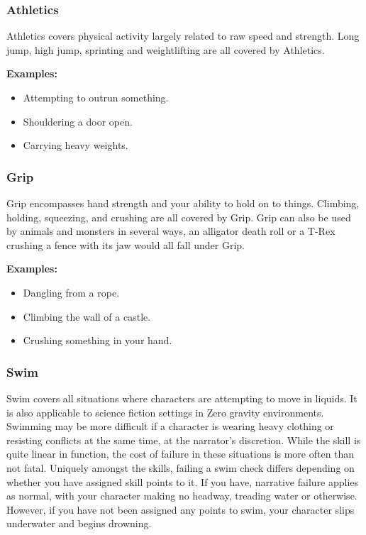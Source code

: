 \subsubsection{Athletics} \label{subsubsec:athletics}

Athletics covers physical activity largely related to raw speed and strength. Long jump, high jump, sprinting and weightlifting are all covered by Athletics.

\begin{displayquote}
    \textbf{Examples:}
    \begin{itemize}
        \item Attempting to outrun something.
        \item Shouldering a door open.
        \item Carrying heavy weights.
    \end{itemize}
\end{displayquote}

\subsubsection{Grip} \label{subsubsec:grip}

Grip encompasses hand strength and your ability to hold on to things. Climbing, holding, squeezing, and crushing are all covered by Grip. Grip can also be used by animals and monsters in several ways, an alligator death roll or a T-Rex crushing a fence with its jaw would all fall under Grip.

\begin{displayquote}
    \textbf{Examples:}
    \begin{itemize}
        \item Dangling from a rope.
        \item Climbing the wall of a castle.
        \item Crushing something in your hand.
    \end{itemize}
\end{displayquote}

\subsubsection{Swim} \label{subsubsec:swim}

Swim covers all situations where characters are attempting to move in liquids. It is also applicable to science fiction settings in Zero gravity environments. Swimming may be more difficult if a character is wearing heavy clothing or resisting conflicts at the same time, at the narrator's discretion. While the skill is quite linear in function, the cost of failure in these situations is more often than not fatal. Uniquely amongst the skills, failing a swim check differs depending on whether you have assigned skill points to it. If you have, narrative failure applies as normal, with your character making no headway, treading water or otherwise. However, if you have not been assigned any points to swim, your character slips underwater and begins drowning.

